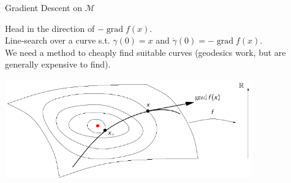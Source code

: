 \documentclass[xcolor=dvipsnames,t]{beamer} %
\begin{document}
\begin{frame}{Gradient Descent on $\mathcal{M}$}

   Head in the direction of $-\operatorname{grad}f(x)$.\\[0.5em]

   \noindent Line-search over a curve s.t. $\gamma(0)=x$ and $\dot{\gamma}(0)=-\operatorname{grad}f(x)$.\\[0.5em]

   \noindent We need a method to cheaply find suitable curves (geodesics work, but are generally expensive to find).\\
       
   \begin{center}
      \includegraphics[width=0.8\textwidth]{figures/GD_M.pdf}
   \end{center}

\end{frame}
\end{document}
